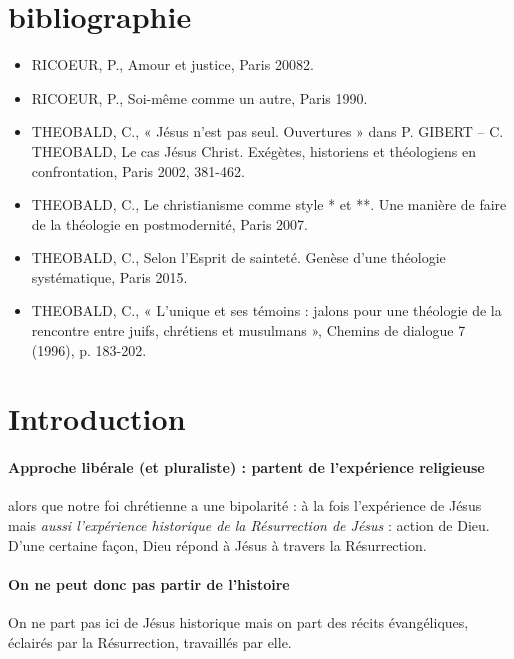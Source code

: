  

\section{bibliographie}

\begin{itemize}
    \item RICOEUR, P., Amour et justice, Paris 20082.
   \item RICOEUR, P., Soi-même comme un autre, Paris 1990.
   \item THEOBALD, C., « Jésus n’est pas seul. Ouvertures » dans P. GIBERT – C. THEOBALD, Le cas
Jésus Christ. Exégètes, historiens et théologiens en confrontation, Paris 2002, 381-462.
   \item THEOBALD, C., Le christianisme comme style * et **. Une manière de faire de la théologie en
postmodernité, Paris 2007. \cite{theobald_christianisme_2007} 
   \item THEOBALD, C., Selon l’Esprit de sainteté. Genèse d’une théologie systématique, Paris 2015.
   \item THEOBALD, C., « L’unique et ses témoins : jalons pour une théologie de la rencontre entre
juifs, chrétiens et musulmans », Chemins de dialogue 7 (1996), p. 183-202.
\end{itemize}

\section{Introduction}


\paragraph{Approche libérale (et pluraliste) : partent de l'expérience religieuse} alors que notre foi chrétienne a une bipolarité : à la fois l'expérience de Jésus mais \textit{aussi l'expérience historique de la Résurrection de Jésus} : action de Dieu. D'une certaine façon, Dieu répond à Jésus à travers la Résurrection.

\paragraph{On ne peut donc pas partir de l'histoire} On ne part pas ici de Jésus historique mais on part des récits évangéliques, éclairés par la Résurrection, travaillés par elle.


